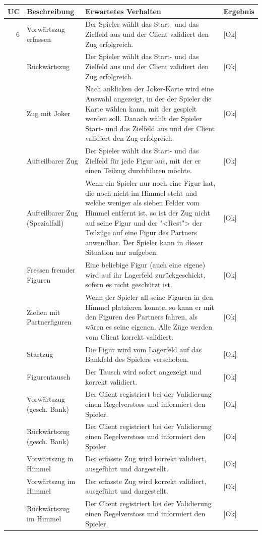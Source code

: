 \documentclass[12pt,halfparskip]{scrartcl}
\begin{document}
	\begin {tabular}{r | p{3cm} | p{9cm} | l}
		\toprule
		\textbf{UC} & \textbf{Beschreibung} & \textbf{Erwartetes Verhalten} & \textbf{Ergebnis} \\
		\midrule
		6 & Vorwärtszug erfassen & Der Spieler wählt das Start- und das Zielfeld aus und der Client validiert den Zug erfolgreich. & [Ok] \\
		\cline{3-4} & Rückwärtszug & Der Spieler wählt das Start- und das Zielfeld aus und der Client validiert den Zug erfolgreich. & [Ok] \\
		\cline{3-4} & Zug mit Joker & Nach anklicken der Joker-Karte wird eine Auswahl angezeigt, in der der Spieler die Karte wählen kann, mit der gespielt werden soll. Danach wählt der Spieler Start- und das Zielfeld aus und der Client validiert den Zug erfolgreich. & [Ok] \\
		\cline{3-4} & Aufteilbarer Zug & Der Spieler wählt das Start- und das Zielfeld für jede Figur aus, mit der er einen Teilzug durchführen möchte. & [Ok] \\
		\cline{3-4} & Aufteilbarer Zug (Spezialfall) & Wenn ein Spieler nur noch eine Figur hat, die noch nicht im Himmel steht und welche weniger als sieben Felder vom Himmel entfernt ist, so ist der Zug nicht auf seine Figur und der "<Rest"> der Teilzüge auf eine Figur des Partners anwendbar. Der Spieler kann in dieser Situation nur aufgeben. & [Ok] \\
		\cline{3-4} & Fressen fremder Figuren & Eine beliebige Figur (auch eine eigene) wird auf ihr Lagerfeld zurückgeschickt, sofern es nicht geschützt ist. & [Ok] \\
		\cline{3-4} & Ziehen mit Partnerfiguren & Wenn der Spieler all seine Figuren in den Himmel platzieren konnte, so kann er mit den Figuren des Partners fahren, als wären es seine eigenen. Alle Züge werden vom Client korrekt validiert. & [Ok] \\
		\cline{3-4} & Startzug & Die Figur wird vom Lagerfeld auf das Bankfeld des Spielers verschoben. & [Ok] \\
		\cline{3-4} & Figurentausch & Der Tausch wird sofort angezeigt und korrekt validiert. & [Ok] \\
		\cline{3-4} & Vorwärtszug (gesch. Bank) & Der Client registriert bei der Validierung einen Regelverstoss und informiert den Spieler. & [Ok] \\
		\cline{3-4} & Rückwärtszug (gesch. Bank) & Der Client registriert bei der Validierung einen Regelverstoss und informiert den Spieler. & [Ok] \\
		\cline{3-4} & Vorwärtszug in Himmel & Der erfasste Zug wird korrekt validiert, ausgeführt und dargestellt. & [Ok] \\
		\cline{3-4} & Vorwärtszug im Himmel & Der erfasste Zug wird korrekt validiert, ausgeführt und dargestellt. & [Ok] \\
		\cline{3-4} & Rückwärtszug im Himmel & Der Client registriert bei der Validierung einen Regelverstoss und informiert den Spieler. & [Ok] \\
		\bottomrule
	\end{tabular}
	
\end{document}
